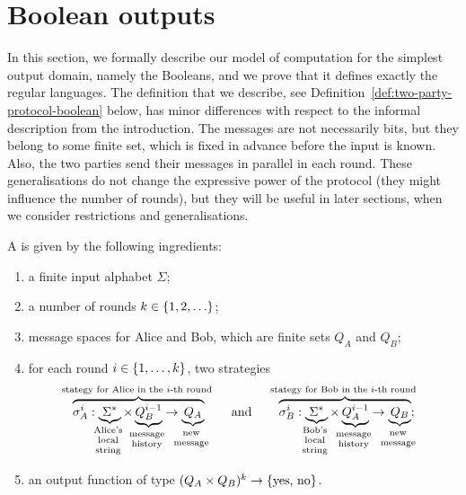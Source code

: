 
\section{Boolean outputs}
\label{sec:boolean-domain}

In this section, we formally describe our model of computation for the simplest
output domain, namely the Booleans, and we prove that it defines exactly the
regular languages.  The definition that we describe, see
Definition~\ref{def:two-party-protocol-boolean} below, has minor differences
with respect to the informal description from the introduction. The messages
are not necessarily bits, but they belong to some finite set, which is fixed in
advance before the input is known. Also,  the two parties send their messages
in parallel in each round. These generalisations do not change the expressive
power of the protocol (they might influence the number of rounds), but they
will be useful in later sections, when we consider restrictions and
generalisations. 

\begin{definition}
    \label{def:two-party-protocol-boolean}
   A 
   is given by the following ingredients: 
  \begin{enumerate}
    \item a finite input alphabet $\Sigma$;
    \item a number of rounds $k \in \{1,2,\ldots\}$;
    \item message spaces for Alice and Bob, which are finite sets $Q_A$ and $Q_B$;
    \item for each round $i \in \{1,\ldots,k\}$, two strategies
    \begin{align*}
    \myoverbrace{\sigma_A^i : \myunderbrace{\Sigma^*}{Alice's \\ local\\ string} \times \myunderbrace{Q_B^{i-1}}{message \\ history}  \to \myunderbrace{Q_A}{new\\ message}}{stategy for Alice in the $i$-th round}
    \qquad \text{and} \qquad 
        \myoverbrace{\sigma_B^i : \myunderbrace{\Sigma^*}{Bob's \\ local\\ string} \times \myunderbrace{Q_A^{i-1}}{message \\ history}  \to \myunderbrace{Q_B}{new\\ message}}{stategy for Bob in the $i$-th round};
    \end{align*}
    \item an output function of type $(Q_A \times Q_B)^{k} \to \{\text{yes, no}\}$.
  \end{enumerate}
\end{definition}

